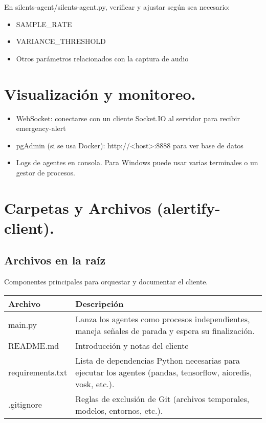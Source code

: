 En silents-agent/silents-agent.py, verificar y ajustar según sea necesario:

\begin{itemize}
  \item SAMPLE\_RATE
  \item VARIANCE\_THRESHOLD
  \item Otros parámetros relacionados con la captura de audio
\end{itemize}

\section*{Visualización y monitoreo.}

\begin{itemize}
  \item WebSocket: conectarse con un cliente Socket.IO al servidor para recibir emergency-alert
  \item pgAdmin (si se usa Docker): http://<host>:8888 para ver base de datos
  \item Logs de agentes en consola. Para Windows puede usar varias terminales o un gestor de procesos.
\end{itemize}

\section*{Carpetas y Archivos (alertify-client).}

\subsection*{Archivos en la raíz}

Componentes principales para orquestar y documentar el cliente.

\begin{table}[H]
  \doublespacing
  \begin{tabularx}{\textwidth}{l X}
    \hline
    \textbf{Archivo} & \textbf{Descripción}                                                                       \\
    \hline
    main.py          &
    Lanza los agentes como procesos independientes, maneja señales de parada y espera su finalización.            \\
    README.md        &
    Introducción y notas del cliente                                                                              \\
    requirements.txt &
    Lista de dependencias Python necesarias para ejecutar los agentes (pandas, tensorflow, aioredis, vosk, etc.). \\
    .gitignore       &
    Reglas de exclusión de Git (archivos temporales, modelos, entornos, etc.).                                    \\
    \hline
  \end{tabularx}
\end{table}

